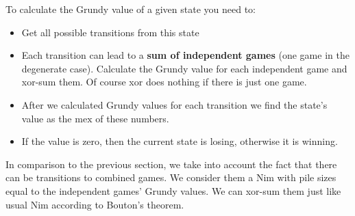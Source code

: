 To calculate the Grundy value of a given state you need to:

\begin{itemize}
    \item Get all possible transitions from this state
    \item Each transition can lead to a \textbf{sum of independent games} (one game in the degenerate case).
    Calculate the Grundy value for each independent game and xor-sum them.
    Of course xor does nothing if there is just one game.
    \item After we calculated Grundy values for each transition we find the state's value as the $\text{mex}$ of these numbers.
    \item If the value is zero, then the current state is losing, otherwise it is winning.
\end{itemize}

In comparison to the previous section, we take into account the fact that there can be transitions to combined games.
We consider them a Nim with pile sizes equal to the independent games' Grundy values.
We can xor-sum them just like usual Nim according to Bouton's theorem.